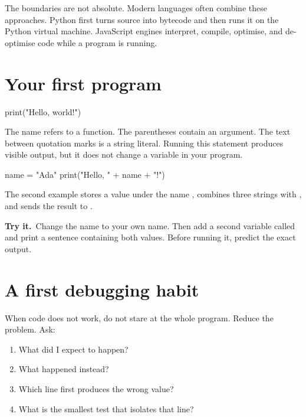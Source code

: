 \documentclass[11pt,openany,oneside]{book}
\newcommand{\inlinecode}[1]{\texttt{\small\detokenize{#1}}}
\newcommand{\tryit}{\textsf{\bfseries\color{orange}Try it.}\ }
\begin{document}
The boundaries are not absolute. Modern languages often combine these approaches. Python first turns source into bytecode and then runs it on the Python virtual machine. JavaScript engines interpret, compile, optimise, and de-optimise code while a program is running.

\section{Your first program}

\begin{code}[language=Python]
print("Hello, world!")
\end{code}

The name \inlinecode{print} refers to a function. The parentheses contain an argument. The text between quotation marks is a string literal. Running this statement produces visible output, but it does not change a variable in your program.

\begin{code}[language=Python]
name = "Ada"
print("Hello, " + name + "!")
\end{code}

The second example stores a value under the name \inlinecode{name}, combines three strings with \inlinecode{+}, and sends the result to \inlinecode{print}.

\begin{exercisebox}
\tryit Change the name to your own name. Then add a second variable called \inlinecode{year} and print a sentence containing both values. Before running it, predict the exact output.
\end{exercisebox}

\section{A first debugging habit}

When code does not work, do not stare at the whole program. Reduce the problem. Ask:

\begin{enumerate}
  \item What did I expect to happen?
  \item What happened instead?
  \item Which line first produces the wrong value?
  \item What is the smallest test that isolates that line?
\end{enumerate}
\end{document}
